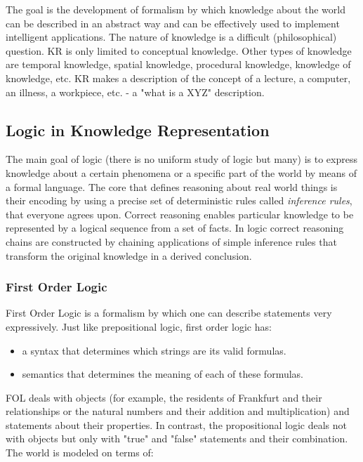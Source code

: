 The goal is the development of formalism by which knowledge about the world can be described in an abstract way and can be effectively used to implement intelligent applications. The nature of knowledge is a difficult (philosophical) question. KR is only limited to conceptual knowledge. Other types of knowledge are temporal knowledge, spatial knowledge, procedural knowledge, knowledge of knowledge, etc. KR makes a description of the concept of a lecture, a computer, an illness, a workpiece, etc. - a "what is a XYZ" description.

\subsection{Logic in Knowledge Representation}
The main goal of logic (there is no uniform study of logic but many) is to express knowledge about a certain phenomena or a specific part of the world by means of a formal language. The core that defines reasoning about real world things is their encoding by using a precise set of deterministic rules called \textit{inference rules}, that everyone agrees upon. Correct reasoning enables particular knowledge to be represented by a logical sequence from a set of facts. In logic correct reasoning chains are constructed by chaining applications of simple inference rules that transform the original knowledge in a derived conclusion. 

\subsubsection{First Order Logic}
First Order Logic is a formalism by which one can describe statements very expressively. Just like prepositional logic, first order logic has:

\begin{itemize}
    \item a syntax that determines which strings are its valid formulas.
    \item semantics that determines the meaning of each of these formulas.
\end{itemize}

FOL deals with objects (for example, the residents of Frankfurt and their relationships or the natural numbers and their addition and multiplication) and statements about their properties. In contrast, the propositional logic deals not with objects but only with "true" and "false" statements and their combination.
The world is modeled on terms of:

